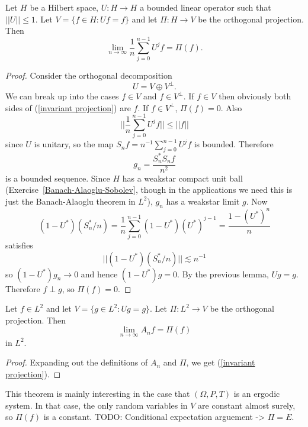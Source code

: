 \begin{lemma}
Let $H$ be a Hilbert space, $U: H \to H$ a bounded linear operator such that $||U|| \leq 1$.
Let $V = \{f \in H: Uf = f\}$ and let $\Pi: H \to V$ be the orthogonal projection. Then
\begin{equation}\label{invariant projection}
\lim_{n \to \infty} \frac{1}{n} \sum_{j=0}^{n-1} U^jf = \Pi(f).
\end{equation}
\end{lemma}
\begin{proof}
Consider the orthogonal decomposition
\[U = V \oplus V^\perp.\]
We can break up into the cases $f \in V$ and $f \in V^\perp$.
If $f \in V$ then obviously both sides of (\ref{invariant projection}) are $f$.
If $f \in V^\perp$, $\Pi(f) = 0$.
Also
\[||\frac{1}{n} \sum_{j=0}^{n-1} U^jf|| \leq ||f||\]
since $U$ is unitary, so the map $S_{n}f = n^{-1} \sum_{j=0}^{n-1} U^jf$ is bounded.
Therefore
\[g_{n} = \frac{S_{n}^*S_{n}f}{n^2}\]
is a bounded sequence. Since $H$ has a weakstar compact unit ball (Exercise~\ref{Banach-Alaoglu-Sobolev}, though in the applications we need this is just the Banach-Alaoglu theorem in $L^2$), $g_{n}$ has a weakstar limit $g$.
Now
\[(1 - U^*)(S_{n}^*/n) = \frac{1}{n} \sum_{j=0}^{n-1} (1 - U^*)(U^*)^{j-1} = \frac{1 - (U^*)^n}{n}\]
satisfies
\[||(1 - U^*)(S_{n}^*/n)|| \lesssim n^{-1}\]
so $(1 - U^*)g_{n} \to 0$ and hence $(1 - U^*)g = 0$.
By the previous lemma, $Ug = g$. Therefore $f \perp g$, so $\Pi(f) = 0$.
\end{proof}

\begin{theorem}
Let $f \in L^2$ and let $V = \{g \in L^2: Ug = g\}$.
Let $\Pi: L^2 \to V$ be the orthogonal projection.
Then
\[\lim_{n \to \infty} A_{n}f = \Pi(f)\]
in $L^2$.
\end{theorem}
\begin{proof}
Expanding out the definitions of $A_{n}$ and $\Pi$, we get (\ref{invariant projection}).
\end{proof}

This theorem is mainly interesting in the case that $(\Omega, P, T)$ is an ergodic system.
In that case, the only random variables in $V$ are constant almost surely, so $\Pi(f)$ is a constant.
TODO: Conditional expectation arguement -> $\Pi = E$.
